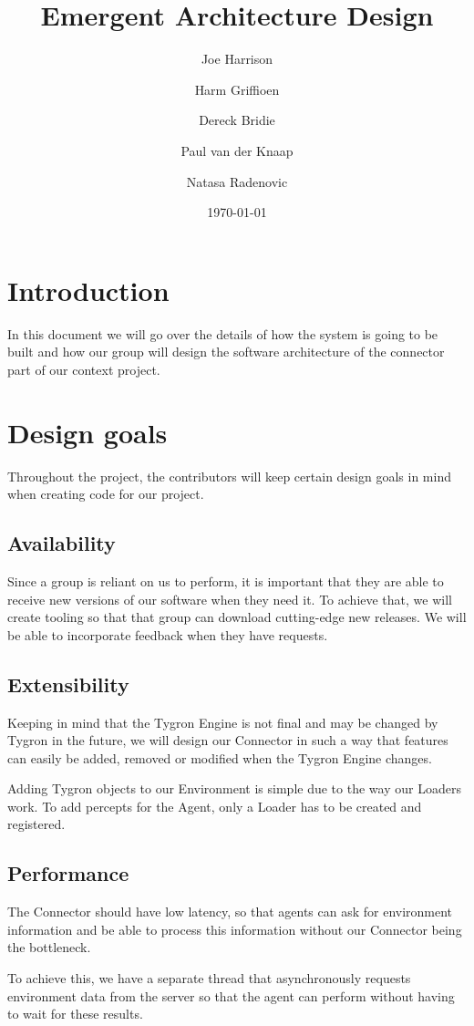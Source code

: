 \documentclass[a4paper]{article}
\title{Emergent Architecture Design}
\author{Joe Harrison \and Harm Griffioen \and Dereck Bridie \and Paul van der Knaap \and Natasa Radenovic}
\date{\today}
\begin{document}
\maketitle

\section{Introduction}
In this document we will go over the details of how the system is going to be built and how our group will design the software architecture of the connector part of our context project. 

\section{Design goals}
Throughout the project, the contributors will keep certain design goals in mind when creating code for our project.

\subsection{Availability}
Since a group is reliant on us to perform, it is important that they are able to receive new versions of our software when they need it. To achieve that, we will create tooling so that that group can download cutting-edge new releases. We will be able to incorporate feedback when they have requests.

\subsection{Extensibility}
Keeping in mind that the Tygron Engine is not final and may be changed by Tygron in the future, we will design our Connector in such a way that features can easily be added, removed or modified when the Tygron Engine changes.

Adding Tygron objects to our Environment is simple due to the way our Loaders work. To add percepts for the Agent, only a Loader has to be created and registered. 

\subsection{Performance}
The Connector should have low latency, so that agents can ask for environment information and be able to process this information without our Connector being the bottleneck. 

To achieve this, we have a separate thread that asynchronously requests environment data from the server so that the agent can perform without having to wait for these results.
\end{document}
